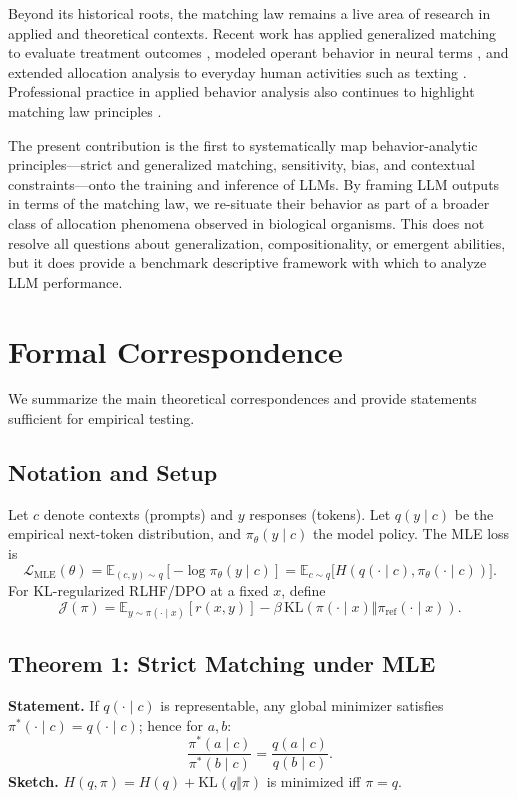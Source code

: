 \documentclass[11pt]{article}
\begin{document}
Beyond its historical roots, the matching law remains a live area of research in
applied and theoretical contexts. Recent work has applied generalized matching
to evaluate treatment outcomes \citep{kronfli2021matching}, modeled operant
behavior in neural terms \citep{rajagopalan2023reward}, and extended allocation
analysis to everyday human activities such as texting
\citep{anderson2024texting}. Professional practice in applied behavior analysis
also continues to highlight matching law principles
\citep{mastermind2025matching}.

The present contribution is the first to systematically map
behavior-analytic principles---strict and generalized matching,
sensitivity, bias, and contextual constraints---onto the training and
inference of LLMs. By framing LLM outputs in terms of the matching
law, we re-situate their behavior as part of a broader class of
allocation phenomena observed in biological organisms. This does not
resolve all questions about generalization, compositionality, or
emergent abilities, but it does provide a benchmark descriptive
framework with which to analyze LLM performance.

\section{Formal Correspondence}
We summarize the main theoretical correspondences and provide statements sufficient for empirical testing.

\subsection{Notation and Setup}
Let $c$ denote contexts (prompts) and $y$ responses (tokens). Let $q(y\mid c)$ be the empirical next-token distribution, and $\pi_\theta(y\mid c)$ the model policy. The MLE loss is
\[
\mathcal{L}_{\text{MLE}}(\theta)=\mathbb{E}_{(c,y)\sim q}[-\log \pi_\theta(y\mid c)] = \mathbb{E}_{c\sim q}\big[H(q(\cdot\mid c),\pi_\theta(\cdot\mid c))\big].
\]
For KL-regularized RLHF/DPO at a fixed $x$, define
\[\mathcal{J}(\pi)=\mathbb{E}_{y\sim \pi(\cdot\mid x)}[r(x,y)]-\beta\,\mathrm{KL}(\pi(\cdot\mid x)\Vert \pi_{\text{ref}}(\cdot\mid x)).\]

\subsection{Theorem 1: Strict Matching under MLE}
\textbf{Statement.} If $q(\cdot\mid c)$ is representable, any global minimizer satisfies $\pi^{*}(\cdot\mid c)=q(\cdot\mid c)$; hence for $a,b$:
\[\frac{\pi^{*}(a\mid c)}{\pi^{*}(b\mid c)}=\frac{q(a\mid c)}{q(b\mid c)}.\]
\textbf{Sketch.} $H(q,\pi)=H(q)+\mathrm{KL}(q\Vert \pi)$ is minimized iff $\pi=q$.
\end{document}
